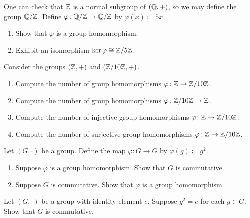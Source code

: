\documentclass[../notes.tex]{subfiles}
\begin{document}
\begin{homework}
    One can check that $\mathbb Z$ is a normal subgroup of $(\mathbb Q,+)$, so we may define the group $\mathbb Q/\mathbb Z$. Define $\varphi\colon\mathbb Q/\mathbb Z\to\mathbb Q/\mathbb Z$ by $\varphi(x)\coloneqq 5x$.
    \begin{enumerate}[label=(\alph*)]
        \item Show that $\varphi$ is a group homomorphism.
        \item Exhibit an isomorphism $\ker\varphi\cong\mathbb Z/5\mathbb Z$.
    \end{enumerate}
\end{homework}

\begin{homework}
    Consider the groups $(\mathbb Z,+)$ and $(\mathbb Z/10\mathbb Z,+)$.
    \begin{enumerate}[label=(\alph*)]
        \item Compute the number of group homomorphisms $\varphi\colon\mathbb Z\to\mathbb Z/10\mathbb Z$.
        \item Compute the number of group homomorphisms $\varphi\colon\mathbb Z/10\mathbb Z\to\mathbb Z$.
        \item Compute the number of injective group homomorphisms $\varphi\colon\mathbb Z\to\mathbb Z/10\mathbb Z$.
        \item Compute the number of surjective group homomorphisms $\varphi\colon\mathbb Z\to\mathbb Z/10\mathbb Z$.
    \end{enumerate}
\end{homework}

\begin{homework}
    Let $(G,\cdot)$ be a group. Define the map $\varphi\colon G\to G$ by $\varphi(g)\coloneqq g^2$.
    \begin{enumerate}[label=(\alph*)]
        \item Suppose $\varphi$ is a group homomorphism. Show that $G$ is commutative.
        \item Suppose $G$ is commutative. Show that $\varphi$ is a group homomorphism.
    \end{enumerate}
\end{homework}

\begin{homework}
    Let $(G,\cdot)$ be a group with identity element $e$. Suppose $g^2=e$ for each $g\in G$. Show that $G$ is commutative.
\end{homework}
\end{document}
